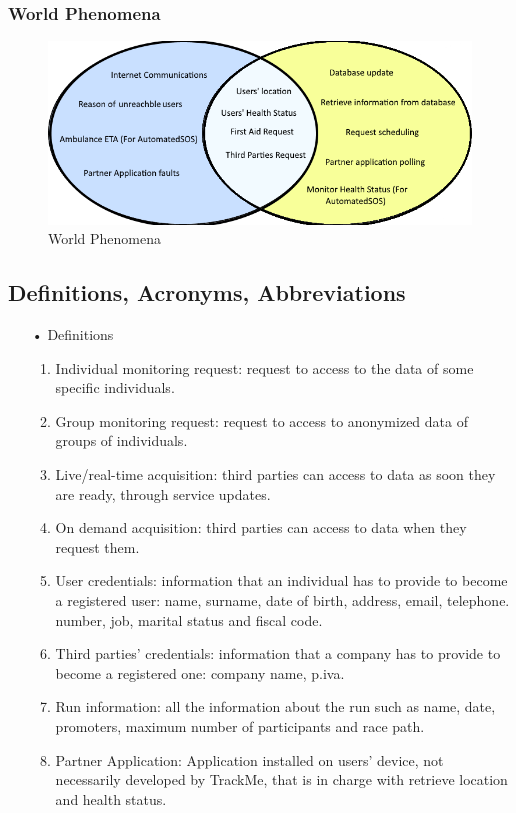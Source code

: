 \subsubsection{World Phenomena}
\begin{figure}[H]
\includegraphics[scale=0.8]{Images/WordPhen.png}
\caption{World Phenomena}
\end{figure}

\subsection{Definitions, Acronyms, Abbreviations}

\begin{enumerate}
\item[•] {\Large Definitions}
	\begin{enumerate}
		\item Individual monitoring request: request to access to the data of some specific  individuals.
		\item Group monitoring request: request to access to anonymized data of groups of individuals.
		\item Live/real-time acquisition: third parties can access to data as soon they are ready, 				through service updates.
		\item On demand acquisition: third parties can access to data when they request 				them.
		\item User credentials: information that an individual has to provide to become a 				registered user: name, surname, date of birth, address, email, telephone.
			number, job, marital status and fiscal code. 
		\item Third parties' credentials: information that a company has to provide to 					become a registered one: company name, p.iva.
		\item Run information: all the information about the run such as name, date, promoters, 				maximum number of participants and race path.
		\item Partner Application: Application installed on users' device, not necessarily developed by TrackMe, that is in charge with retrieve location and health status. 
	\end{enumerate}
\end{enumerate}

